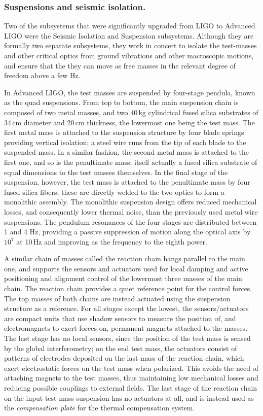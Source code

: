 \subsubsection{Suspensions and seismic isolation.}
Two of the subsystems that were significantly upgraded from LIGO to Advanced LIGO
were the Seismic Isolation\cite{SEI2015} and Suspension subsystems. Although they 
are formally two separate subsystems, they work in concert to isolate the test-masses and 
other critical optics from ground vibrations and other macroscopic motions, and ensure 
that the they can move as free masses in the relevant degree of freedom above a few Hz.

In Advanced LIGO, the test masses are suspended by four-stage pendula, known as the quad suspensions\cite{Aston_2012}. 
From top to bottom, the main suspension chain is composed of two metal masses, and two 40\,kg cylindrical fused silica substrates
of 34\,cm diameter and 20\,cm thickness, the lowermost one being the test mass.
The first metal mass is attached to the suspension structure by four blade springs providing vertical isolation;
a steel wire runs from the tip of each blade to the 
suspended mass.
In a similar fashion, the second metal mass is attached to the first one, 
and so is the penultimate mass; itself actually a fused silica substrate of equal dimensions to the test masses themselves. 
In the final stage of the suspension, however, the test mass 
is attached to the penultimate mass by four fused silica fibers; these are directly welded to 
the two optics to form a monolithic assembly.
The monolithic suspension design offers reduced mechanical losses, and
consequently lower thermal noise, than the previously used metal wire suspensions.
The pendulum resonances of the four stages are 
distributed between 1 and 4 Hz, providing a passive suppression of motion along 
the optical axis by $10^7$ at 10\,Hz and improving as the frequency to the eighth power.

A similar chain of masses called the reaction chain hangs parallel to the main one, 
and supports the sensors and actuators used for local damping and active positioning and alignment control 
of the lowermost three masses of the main chain. The reaction chain provides a quiet reference point 
for the control forces.
The top masses of both chains are instead actuated using the suspension structure as a reference.
For all stages except the lowest, the sensors/actuators are compact units that use shadow sensors to measure the position of, and electromagnets to exert forces on, permanent magnets attached to the masses.
The last stage has no local sensors, since the position of the test mass is sensed 
by the global interferometry; on the end test mass, the actuators consist of patterns of electrodes 
deposited on the last mass of the reaction chain, which exert electrostatic forces on the test mass when polarized.
This avoids the need of attaching magnets to the test masses, thus maintaining low mechanical 
losses and reducing possible couplings to external fields.
The last stage of the reaction chain on the input test mass suspension has no actuators at all, and is instead used as the \textit{compensation plate} for the thermal compensation system.

